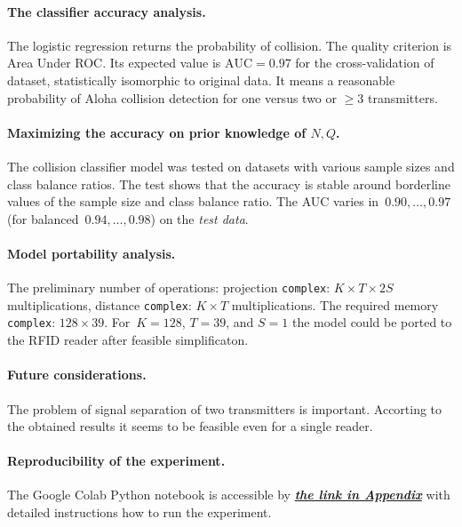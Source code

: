 \documentclass[12pt]{article}
\newcommand{\bw}{\mathbf{w}}
\newcommand{\T}{^\mathsf{T}}
\newcommand{\bx}{\mathbf{x}}
\begin{document}
\paragraph{The classifier accuracy analysis.} The logistic regression returns the probability of collision. The quality criterion is Area Under ROC. Its expected value is $\text{AUC} = 0.97$ for the cross-validation of dataset, statistically isomorphic to original data. It means a reasonable probability of Aloha collision detection for one versus two or $\geq 3$ transmitters. 

\paragraph{Maximizing the accuracy on prior knowledge of $N,Q$.} %
The collision classifier model was tested on datasets with various sample sizes and class balance ratios. The test shows that the accuracy is stable around borderline values of the sample size and class balance ratio. The AUC varies in~$0.90,\ldots,0.97$ (for balanced~$0.94,\ldots,0.98$) on the \emph{test data}. 

\paragraph{Model portability analysis.} The preliminary number of  operations: projection \texttt{complex}: $K \times T \times 2S$ multiplications, distance  \texttt{complex}: $K \times T$  multiplications. The required memory \texttt{complex}: $128\times 39$.  For~$K=128$, $T=39$, and  $S=1$ the model could be ported to the RFID reader after feasible simplificaton.

\paragraph{Future considerations.} The problem of signal separation of two transmitters is important. Accorting to the obtained results it seems to be feasible even for a single reader.
 
\paragraph{Reproducibility of the experiment. } The Google Colab Python notebook is accessible by  {\bf \emph{\hyperref[sec:experiment]{the link in  Appendix}}} with detailed instructions how to run the experiment.
\end{document}
